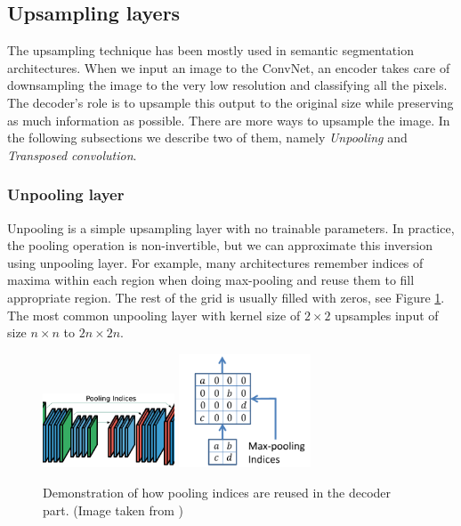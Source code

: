 \subsection{Upsampling layers}
\label{sec:cnn:upsampling_layers}

The upsampling technique has been mostly used in semantic segmentation architectures.
When we input an image to the ConvNet, an encoder takes care of downsampling the image
to the very low resolution and classifying all the pixels. The decoder's role is to
upsample this output to the original size while preserving as much information as possible.
There are more ways to upsample the image. In the following subsections we describe
two of them, namely \textit{Unpooling} and \textit{Transposed convolution}.

\subsubsection{Unpooling layer}
\label{sec:cnn:upsampling_layers:unpooling_layer}

Unpooling is a simple upsampling layer with no trainable parameters. In practice,
the pooling operation is non-invertible, but we can approximate this inversion 
using unpooling layer. For example, many architectures
remember indices of maxima within each region when doing max-pooling and reuse them
to fill appropriate region. The rest of the grid is usually filled with zeros, see Figure
\ref{img:poolingindices}.
The most common unpooling layer with kernel size of $2\times 2$ upsamples
input of size $n\times n$ to $2n\times 2n$. \cite{bib:zeiler2014visualizing}

\begin{figure}[!h]
	\centerline{\includegraphics[width=0.35\textwidth]{images/pooling_indices2.png}
	    \includegraphics[width=0.35\textwidth]{images/pooling_indices.png}}
	\caption[Demonstration of how pooling indices are reused]{Demonstration of how pooling indices are reused in the decoder part. (Image taken from \cite{bib:szegedy2015going})}
	\label{img:poolingindices}
\end{figure}

